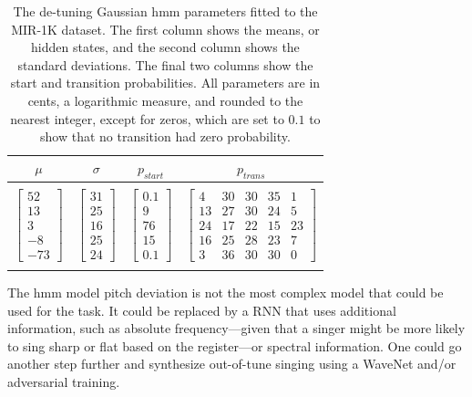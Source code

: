 \begin{table}[t]
  \begin{center}
    \begin{tabular}{|c|c|c|c|}
    \hline
      $\mu$ & $\sigma$ & $p_{start}$ & $p_{trans}$ \\
      \hline
      &&& \\
      $\left[ \begin{array}{c} 52 \\  13 \\3\\-8\\-73 \end{array}\right]$
      & $\left[ \begin{array}{c} 31  \\ 25\\16\\25\\24 \end{array}\right]$
      & $\left[ \begin{array}{c} 0.1  \\ 9\\76\\15\\0.1 \end{array}\right]$
      & $\left[ \begin{array}{ccccc} 4 & 30 & 30 & 35 & 1  \\ 13&27&30&24&5\\24&17&22&15&23\\16&25&28&23&7\\3&36&30&30&0 \end{array}\right]$  \\
      &&& \\
      \hline
    \end{tabular}
    \label{tab:detuning-hmm}
    \caption{The de-tuning Gaussian \gls{hmm} parameters fitted to the MIR-1K dataset. The first column shows the means, or hidden states, and the second column shows the standard deviations. The final two columns show the start and transition probabilities. All parameters are in cents, a logarithmic measure, and rounded to the nearest integer, except for zeros, which are set to $0.1$ to show that no transition had zero probability.}
  \end{center}
\end{table}

The \gls{hmm} model pitch deviation is not the most complex model that could be used for the task. It could be replaced by a RNN that uses additional information, such as absolute frequency---given that a singer might be more likely to sing sharp or flat based on the register---or spectral information. One could go another step further and synthesize out-of-tune singing using a WaveNet and/or adversarial training.

